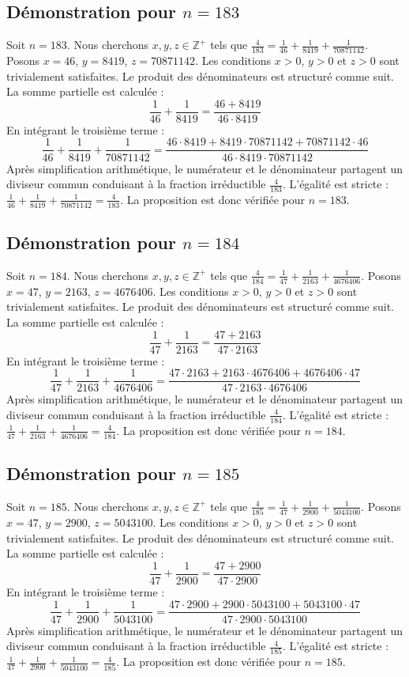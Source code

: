 \documentclass[11pt,a4paper]{article}
\begin{document}
\subsection{Démonstration pour $n = 183$}
Soit $n = 183$. Nous cherchons $x, y, z \in \mathbb{Z}^{+}$ tels que $\frac{4}{183} = \frac{1}{46} + \frac{1}{8419} + \frac{1}{70871142}$.
Posons $x = 46$, $y = 8419$, $z = 70871142$.
Les conditions $x > 0$, $y > 0$ et $z > 0$ sont trivialement satisfaites.
Le produit des dénominateurs est structuré comme suit. La somme partielle est calculée :
$$ \frac{1}{46} + \frac{1}{8419} = \frac{46+8419}{46 \cdot 8419} $$
En intégrant le troisième terme :
$$ \frac{1}{46} + \frac{1}{8419} + \frac{1}{70871142} = \frac{46 \cdot 8419 + 8419 \cdot 70871142 + 70871142 \cdot 46}{46 \cdot 8419 \cdot 70871142} $$
Après simplification arithmétique, le numérateur et le dénominateur partagent un diviseur commun conduisant à la fraction irréductible $\frac{4}{183}$.
L'égalité est stricte : $\frac{1}{46} + \frac{1}{8419} + \frac{1}{70871142} = \frac{4}{183}$.
La proposition est donc vérifiée pour $n = 183$.
\subsection{Démonstration pour $n = 184$}
Soit $n = 184$. Nous cherchons $x, y, z \in \mathbb{Z}^{+}$ tels que $\frac{4}{184} = \frac{1}{47} + \frac{1}{2163} + \frac{1}{4676406}$.
Posons $x = 47$, $y = 2163$, $z = 4676406$.
Les conditions $x > 0$, $y > 0$ et $z > 0$ sont trivialement satisfaites.
Le produit des dénominateurs est structuré comme suit. La somme partielle est calculée :
$$ \frac{1}{47} + \frac{1}{2163} = \frac{47+2163}{47 \cdot 2163} $$
En intégrant le troisième terme :
$$ \frac{1}{47} + \frac{1}{2163} + \frac{1}{4676406} = \frac{47 \cdot 2163 + 2163 \cdot 4676406 + 4676406 \cdot 47}{47 \cdot 2163 \cdot 4676406} $$
Après simplification arithmétique, le numérateur et le dénominateur partagent un diviseur commun conduisant à la fraction irréductible $\frac{4}{184}$.
L'égalité est stricte : $\frac{1}{47} + \frac{1}{2163} + \frac{1}{4676406} = \frac{4}{184}$.
La proposition est donc vérifiée pour $n = 184$.
\subsection{Démonstration pour $n = 185$}
Soit $n = 185$. Nous cherchons $x, y, z \in \mathbb{Z}^{+}$ tels que $\frac{4}{185} = \frac{1}{47} + \frac{1}{2900} + \frac{1}{5043100}$.
Posons $x = 47$, $y = 2900$, $z = 5043100$.
Les conditions $x > 0$, $y > 0$ et $z > 0$ sont trivialement satisfaites.
Le produit des dénominateurs est structuré comme suit. La somme partielle est calculée :
$$ \frac{1}{47} + \frac{1}{2900} = \frac{47+2900}{47 \cdot 2900} $$
En intégrant le troisième terme :
$$ \frac{1}{47} + \frac{1}{2900} + \frac{1}{5043100} = \frac{47 \cdot 2900 + 2900 \cdot 5043100 + 5043100 \cdot 47}{47 \cdot 2900 \cdot 5043100} $$
Après simplification arithmétique, le numérateur et le dénominateur partagent un diviseur commun conduisant à la fraction irréductible $\frac{4}{185}$.
L'égalité est stricte : $\frac{1}{47} + \frac{1}{2900} + \frac{1}{5043100} = \frac{4}{185}$.
La proposition est donc vérifiée pour $n = 185$.
\end{document}
